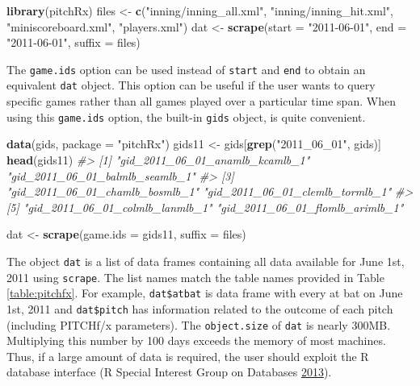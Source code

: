 \documentclass[12pt,]{isuthesis}
\newenvironment{Shaded}{\begin{snugshade}}{\end{snugshade}}
\newcommand{\KeywordTok}[1]{\textcolor[rgb]{0.13,0.29,0.53}{\textbf{{#1}}}}
\newcommand{\DataTypeTok}[1]{\textcolor[rgb]{0.13,0.29,0.53}{{#1}}}
\newcommand{\StringTok}[1]{\textcolor[rgb]{0.31,0.60,0.02}{{#1}}}
\newcommand{\CommentTok}[1]{\textcolor[rgb]{0.56,0.35,0.01}{\textit{{#1}}}}
\newcommand{\NormalTok}[1]{{#1}}
\begin{document}
\begin{Shaded}
\begin{Highlighting}[]
\KeywordTok{library}\NormalTok{(pitchRx)}
\NormalTok{files <-}\StringTok{ }\KeywordTok{c}\NormalTok{(}\StringTok{"inning/inning_all.xml"}\NormalTok{, }\StringTok{"inning/inning_hit.xml"}\NormalTok{, }
  \StringTok{"miniscoreboard.xml"}\NormalTok{, }\StringTok{"players.xml"}\NormalTok{)}
\NormalTok{dat <-}\StringTok{ }\KeywordTok{scrape}\NormalTok{(}\DataTypeTok{start =} \StringTok{"2011-06-01"}\NormalTok{, }\DataTypeTok{end =} \StringTok{"2011-06-01"}\NormalTok{, }\DataTypeTok{suffix =} \NormalTok{files)}
\end{Highlighting}
\end{Shaded}

The \texttt{game.ids} option can be used instead of \texttt{start} and
\texttt{end} to obtain an equivalent \texttt{dat} object. This option
can be useful if the user wants to query specific games rather than all
games played over a particular time span. When using this
\texttt{game.ids} option, the built-in \texttt{gids} object, is quite
convenient.

\begin{Shaded}
\begin{Highlighting}[]
\KeywordTok{data}\NormalTok{(gids, }\DataTypeTok{package =} \StringTok{"pitchRx"}\NormalTok{)}
\NormalTok{gids11 <-}\StringTok{ }\NormalTok{gids[}\KeywordTok{grep}\NormalTok{(}\StringTok{"2011_06_01"}\NormalTok{, gids)]}
\KeywordTok{head}\NormalTok{(gids11)}
\CommentTok{#> [1] "gid_2011_06_01_anamlb_kcamlb_1" "gid_2011_06_01_balmlb_seamlb_1"}
\CommentTok{#> [3] "gid_2011_06_01_chamlb_bosmlb_1" "gid_2011_06_01_clemlb_tormlb_1"}
\CommentTok{#> [5] "gid_2011_06_01_colmlb_lanmlb_1" "gid_2011_06_01_flomlb_arimlb_1"}
\end{Highlighting}
\end{Shaded}

\begin{Shaded}
\begin{Highlighting}[]
\NormalTok{dat <-}\StringTok{ }\KeywordTok{scrape}\NormalTok{(}\DataTypeTok{game.ids =} \NormalTok{gids11, }\DataTypeTok{suffix =} \NormalTok{files)}
\end{Highlighting}
\end{Shaded}

The object \texttt{dat} is a list of data frames containing all data
available for June 1st, 2011 using \texttt{scrape}. The list names match
the table names provided in Table \ref{table:pitchfx}. For example,
\texttt{dat\$atbat} is data frame with every at bat on June 1st, 2011
and \texttt{dat\$pitch} has information related to the outcome of each
pitch (including PITCHf/x parameters). The \texttt{object.size} of
\texttt{dat} is nearly 300MB. Multiplying this number by 100 days
exceeds the memory of most machines. Thus, if a large amount of data is
required, the user should exploit the R database interface (R Special
Interest Group on Databases \protect\hyperlink{ref-DBI}{2013}).
\end{document}
